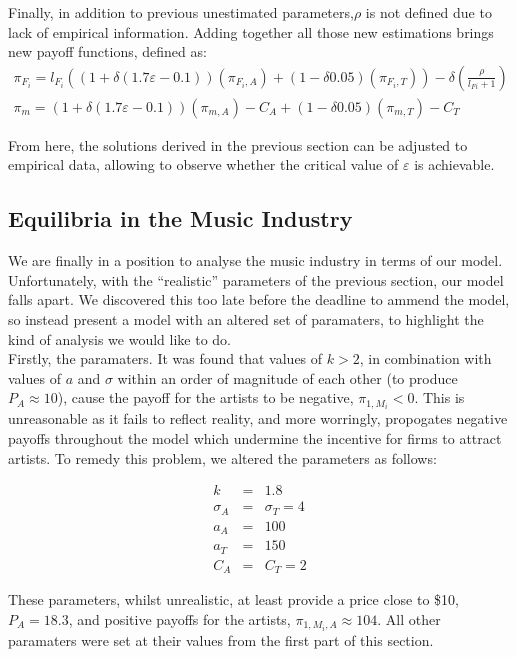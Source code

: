 \documentclass[letter,12pt]{article}
\numberwithin{equation}{section}
\newcommand{\artistpayoff}[2]{\pi_{#1, M_{#2}}}
\newcommand{\artistalbum}[2]{\pi_{#1, M_{#2}, A}}
\begin{document}
Finally, in addition to previous unestimated parameters,$\rho$ is
not defined due to lack of empirical information. Adding together
all those new estimations brings new payoff functions, defined as:
\begin{eqnarray*}
\pi_{F_{i}}=l_{F_{i}}((1+\delta(1.7\varepsilon-0.1))(\pi_{F_{i},A})+(1-\delta0.05)(\pi_{F_{i},T}))-\delta(\frac{\rho}{l_{Fi}+1})\\
\pi_{m}=(1+\delta(1.7\varepsilon-0.1))(\pi_{m,A})-C_{A}+(1-\delta0.05)(\pi_{m,T})-C_{T}
\end{eqnarray*}


From here, the solutions derived in the previous section can be adjusted
to empirical data, allowing to observe whether the critical value
of $\varepsilon$ is achievable.

\subsection{Equilibria in the Music Industry}

We are finally in a position to analyse the music industry in terms of our model. Unfortunately, with the ``realistic'' parameters of the previous section, our model falls apart. We discovered this too late before the deadline to ammend the model, so instead present a model with an altered set of paramaters, to highlight the kind of analysis we would like to do.\\

Firstly, the paramaters. It was found that values of $k > 2$, in combination with values of $a$ and $\sigma$ within an order of magnitude of each other (to produce $P_A \approx 10$), cause the payoff for the artists to be negative, $\artistpayoff{1}{i} < 0$. This is unreasonable as it fails to reflect reality, and more worringly, propogates negative payoffs throughout the model which undermine the incentive for firms to attract artists. To remedy this problem, we altered the parameters as follows:

\begin{eqnarray*}
k & = & 1.8\\
\sigma_A & = & \sigma_T = 4\\
a_A & = & 100\\
a_T & = & 150\\
C_A & = & C_T = 2
\end{eqnarray*}

These parameters, whilst unrealistic, at least provide a price close to \$10, $P_A = 18.3$, and positive payoffs for the artists, $\artistalbum{1}{i} \approx 104$. All other paramaters were set at their values from the first part of this section.\\
\end{document}
